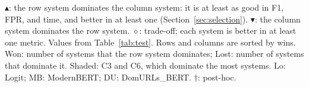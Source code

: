 \begin{table}[!t]
\par\smallskip\begin{minipage}{\linewidth}\scriptsize \textcolor{passc}{$\blacktriangle$}: the row system dominates the column system: it is at least as good in F1, FPR, and time, and better in at least one (Section~\ref{sec:selection}). \textcolor{failc}{$\blacktriangledown$}: the column system dominates the row system. \textcolor{grouptext}{$\diamond$}: trade-off; each system is better in at least one metric. Values from Table~\ref{tab:test}. Rows and columns are sorted by wins. Won: number of systems that the row system dominates; Lost: number of systems that dominate it. Shaded: C3 and C6, which dominate the most systems. Lo: Logit; MB: ModernBERT; DU: DomURLs\_BERT. \(\dagger\): post-hoc.\end{minipage}
\end{table}
